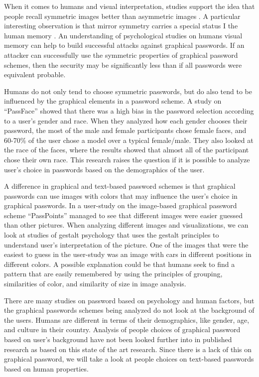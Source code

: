   When it comes to humans and visual interpretation, studies support the idea that people recall symmetric images better than asymmetric images \cite{Attneave, French}. A particular interesting observation is that mirror symmetry carries a special status I the human memory \cite{Wagemans1}. An understanding of psychological studies on humans visual memory can help to build successful attacks against graphical passwords. If an attacker can successfully use the symmetric properties of graphical password schemes, then the security may be significantly less than if all passwords were equivalent probable.

  Humans do not only tend to choose symmetric passwords, but do also tend to be influenced by the graphical elements in a password scheme. A study on ``PassFace'' \cite{Davis} showed that there was a high bias in the password selection according to a user's gender and race. When they analyzed how each gender chooses their password, the most of the male and female participants chose female faces, and 60-70\% of the user chose a model over a typical female/male. They also looked at the race of the faces, where the results showed that almost all of the participant chose their own race. This research raises the question if it is possible to analyze user's choice in passwords based on the demographics of the user.

  A difference in graphical and text-based password schemes is that graphical passwords can use images with colors that may influence the user's choice in graphical passwords. In a user-study \cite{Thorpe2} on the image-based graphical password scheme ``PassPoints'' managed to see that different images were easier guessed than other pictures. When analyzing different images and visualizations, we can look at studies of gestalt psychology \cite{Wagemans2} that uses the gestalt principles to understand user's interpretation of the picture. One of the images that were the easiest to guess in the user-study was an image with cars in different positions in different colors. A possible explanation could be that humans seek to find a pattern that are easily remembered by using the principles of grouping, similarities of color, and similarity of size in image analysis.

  There are many studies on password based on psychology and human factors, but the graphical passwords schemes being analyzed do not look at the background of the users. Humans are different in terms of their demographics, like gender, age, and culture in their country. Analysis of people choices of graphical password based on user's background have not been looked further into in published research as based on this state of the art research. Since there is a lack of this on graphical password, we will take a look at people choices on text-based passwords based on human properties.


